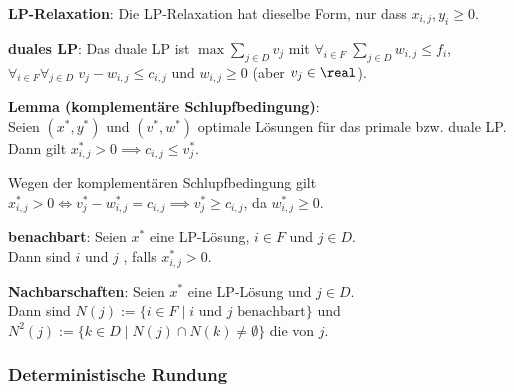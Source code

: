 \textbf{LP-Relaxation}:
Die LP-Relaxation hat dieselbe Form, nur dass $x_{i,j}, y_i \ge 0$.

\textbf{duales LP}:
Das duale LP ist
$\max \sum_{j \in D} v_j$ mit
$\forall_{i \in F}\; \sum_{j \in D} w_{i,j} \le f_i$,
$\forall_{i \in F} \forall_{j \in D}\; v_j - w_{i,j} \le c_{i,j}$ und
$w_{i,j} \ge 0$ (aber $v_j \in \real$).

\linie

\textbf{Lemma (komplementäre Schlupfbedingung)}:\\
Seien $(x^\ast, y^\ast)$ und $(v^\ast, w^\ast)$ optimale Lösungen für das primale bzw. duale LP.\\
Dann gilt $x_{i,j}^\ast > 0 \implies c_{i,j} \le v_j^\ast$.

\begin{Beweis}
    Wegen der komplementären Schlupfbedingung gilt\\
    $x_{i,j}^\ast > 0 \iff v_j^\ast - w_{i,j}^\ast = c_{i,j} \implies v_j^\ast \ge c_{i,j}$,
    da $w_{i,j}^\ast \ge 0$.
\end{Beweis}

\linie

\textbf{benachbart}:
Seien $x^\ast$ eine LP-Lösung, $i \in F$ und $j \in D$.\\
Dann sind $i$ und $j$ , falls $x_{i,j}^\ast > 0$.

\textbf{Nachbarschaften}:
Seien $x^\ast$ eine LP-Lösung und $j \in D$.\\
Dann sind
$N(j) := \{i \in F \;|\; \text{$i$ und $j$ benachbart}\}$ und\\
$N^2(j) := \{k \in D \;|\; N(j) \cap N(k) \not= \emptyset\}$ die  von $j$.

\pagebreak

\subsubsection{%
    Deterministische Rundung%
}

